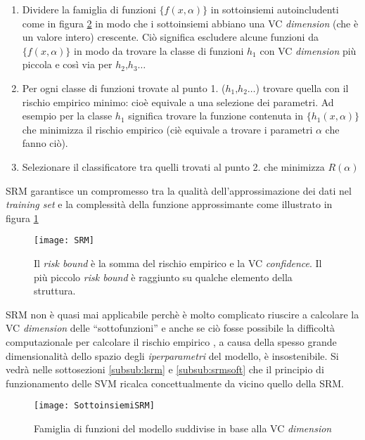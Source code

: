 \begin{enumerate}
\item Dividere la famiglia di funzioni $\{f(x,\alpha)\}$ in sottoinsiemi autoincludenti come in figura \ref{fig:ssrm} in modo che i sottoinsiemi abbiano una \ac{VC} \textit{dimension} (che è un valore intero) crescente. Ciò significa escludere alcune funzioni da $\{f(x,\alpha)\}$ in modo da trovare la classe di funzioni $h_1$ con \ac{VC} \textit{dimension}  più piccola e così via per $h_{2} \text{,}h_{3}\dots$

\item Per ogni classe di funzioni trovate al punto 1. ($h_{1} \text{,}h_{2}\dots$) trovare quella con il rischio empirico minimo: cioè equivale a una selezione dei parametri. Ad esempio per la classe $h_1$ significa trovare la funzione contenuta in $\{h_{1}(x,\alpha)\}$ che minimizza il rischio empirico (ciè equivale a trovare i parametri $\alpha$ che fanno ciò).

\item Selezionare il classificatore tra quelli trovati al punto 2. che minimizza $R(\alpha)$
\end{enumerate}

\ac{SRM} garantisce un compromesso tra la qualità dell'approssimazione dei dati nel \textit{training set} e la complessità della funzione approssimante come illustrato in figura \ref{fig:srm}

\begin{figure}[htp]
	\centering
	\texttt{[image: SRM]}
	\caption[Principio della SRM]{Il \textit{risk bound} è la somma del rischio empirico e la \ac{VC} \textit{confidence}. Il più piccolo \textit{risk bound} è raggiunto su qualche elemento della struttura. }
   \label{fig:srm}
\end{figure} 

\ac{SRM} non è quasi mai applicabile perchè è molto complicato riuscire a calcolare la \ac{VC} \textit{dimension}  delle ``sottofunzioni'' e anche se ciò fosse possibile la difficoltà computazionale per calcolare il rischio empirico , a causa della spesso grande dimensionalità dello spazio degli \textit{iperparametri} del modello, è insostenibile. Si vedrà nelle sottosezioni \ref{subsub:lsrm} e \ref{subsub:srmsoft} che il principio di funzionamento delle \ac{SVM} ricalca concettualmente  da vicino quello della \ac{SRM}.

 \begin{figure}[htp]
	\centering
	\texttt{[image: SottoinsiemiSRM]}
	\caption[Sottoinsiemi SRM]{Famiglia di funzioni del modello suddivise in base alla \ac{VC} \textit{dimension} }
   \label{fig:ssrm}
\end{figure}

